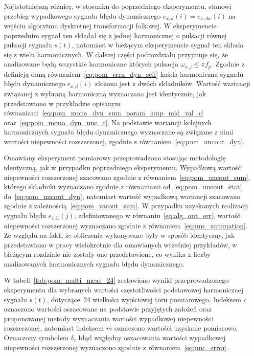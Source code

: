 Najistotniejszą różnicę, w stosunku do poprzedniego eksperymentu, stanowi przebieg wypadkowego sygnału błędu dynamicznego $e_{x,d}(i) = e_{x,dw}(i)$ na wejściu algorytmu dyskretnej transformacji falkowej. W eksperymencie poprzednim sygnał ten składał się z jednej harmonicznej o pulsacji równej pulsacji sygnału $s(t)$, natomiast w bieżącym eksperymencie sygnał ten składa się z wielu harmonicznych. W dalszej części podrozdziału przyjmuje się, że analizowane będą wszystkie harmoniczne których pulsacja $\omega_{x,j} \le \pi f_{p}$. Zgodnie z definicją daną równaniem~\eqref{eq:pom_errx_dyn_self} każda harmoniczna sygnału błędu dynamicznego $e_{x,d}(i)$ złożona jest z dwóch składników. Wartość wariancji związanej z wybraną harmoniczną wyznaczana jest identycznie, jak przedstawiono w przykładzie opisanym równaniami~\eqref{eq:pom_mono_dyn_sum_param_amp_mid_val_c} oraz~\eqref{eq:pom_mono_dyn_unc_c}. Na podstawie wariancji kolejnych harmonicznych sygnału błędu dynamicznego wyznaczane są związane z nimi wartości niepewności rozszerzonej, zgodnie z równaniem~\eqref{eq:pom_uncout_dyn}.

Omawiany eksperyment pomiarowy przeprowadzono stosując metodologię identyczną, jak w przypadku poprzedniego eksperymentu. Wypadkową wartość niepewności rozszerzonej szacowano zgodnie z równaniem~\eqref{eq:pom_uncout_sum}, którego składniki wyznaczano zgodnie z równaniami od~\eqref{eq:pom_uncout_stat} do~\eqref{eq:pom_uncout_dyn}, natomiast wartość wypadkową wariancji szacowano zgodnie z zależnością~\eqref{eq:pom_varout_sum}. W przypadku uzyskanych realizacji sygnału błędu $e_{i,\Sigma}(j)$, zdefiniowanego w równaniu~\eqref{eq:alg_out_err}, wartość niepewności rozszerzonej wyznaczano zgodnie z równaniem~\eqref{eq:unc_summation}. Ze względu na fakt, że obliczenia wykonywane były w sposób identyczny, jak przedstawiano w pracy wielokrotnie dla omawianych wcześniej przykładów, w bieżącym rozdziale nie zostały one przedstawione, co wynika z liczby analizowanych harmonicznych sygnału błędu dynamicznego.

W tabeli~\ref{tab:pom_multi_meas_24} zestawiono wyniki przeprowadzonego eksperymentu dla wybranych wartości częstotliwości podstawowej harmonicznej sygnału $s(t)$, dotyczące~\qty{24}{\numTej} wielkości wyjściowej toru pomiarowego. Indeksem $c$ oznaczono wartości oszacowane na podstawie przyjętych założeń oraz proponowanej metody wyznaczania wartości wypadkowej niepewności rozszerzonej, natomiast indeksem $m$ oznaczono wartości uzyskane pomiarowo. Oznaczony symbolem $\delta_{c}$ błąd względny oszacowania wartości wypadkowej niepewności rozszerzonej wyznaczono zgodnie z równaniem~\eqref{eq:unc_error}.

